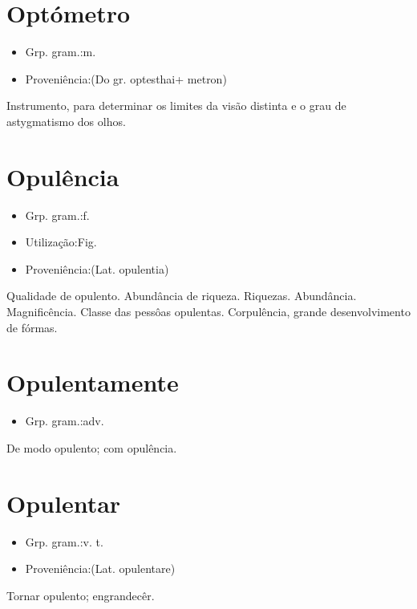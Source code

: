 \section{Optómetro}
\begin{itemize}
\item {Grp. gram.:m.}
\end{itemize}
\begin{itemize}
\item {Proveniência:(Do gr. \textunderscore optesthai\textunderscore  + \textunderscore metron\textunderscore )}
\end{itemize}
Instrumento, para determinar os limites da visão distinta e o grau de astygmatismo dos olhos.
\section{Opulência}
\begin{itemize}
\item {Grp. gram.:f.}
\end{itemize}
\begin{itemize}
\item {Utilização:Fig.}
\end{itemize}
\begin{itemize}
\item {Proveniência:(Lat. \textunderscore opulentia\textunderscore )}
\end{itemize}
Qualidade de opulento.
Abundância de riqueza.
Riquezas.
Abundância.
Magnificência.
Classe das pessôas opulentas.
Corpulência, grande desenvolvimento de fórmas.
\section{Opulentamente}
\begin{itemize}
\item {Grp. gram.:adv.}
\end{itemize}
De modo opulento; com opulência.
\section{Opulentar}
\begin{itemize}
\item {Grp. gram.:v. t.}
\end{itemize}
\begin{itemize}
\item {Proveniência:(Lat. \textunderscore opulentare\textunderscore )}
\end{itemize}
Tornar opulento; engrandecêr.
